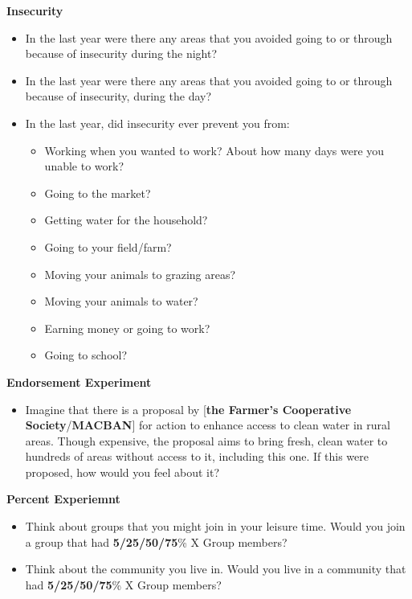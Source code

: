 \documentclass[11pt]{article}
\providecommand{\tightlist}{%
  \setlength{\itemsep}{0pt}\setlength{\parskip}{0pt}}
\begin{document}
\textbf{Insecurity}

\begin{itemize}
\tightlist
\item
  In the last year were there any areas that you avoided going to or
  through because of insecurity during the night?
\item
  In the last year were there any areas that you avoided going to or
  through because of insecurity, during the day?
\item
  In the last year, did insecurity ever prevent you from:

  \begin{itemize}
  \tightlist
  \item
    Working when you wanted to work? About how many days were you unable
    to work?
  \item
    Going to the market?
  \item
    Getting water for the household?
  \item
    Going to your field/farm?
  \item
    Moving your animals to grazing areas?
  \item
    Moving your animals to water?
  \item
    Earning money or going to work?
  \item
    Going to school?
  \end{itemize}
\end{itemize}

\textbf{Endorsement Experiment}

\begin{itemize}
\tightlist
\item
  Imagine that there is a proposal by {[}\textbf{the Farmer's
  Cooperative Society}/\textbf{MACBAN}{]} for action to enhance access
  to clean water in rural areas. Though expensive, the proposal aims to
  bring fresh, clean water to hundreds of areas without access to it,
  including this one. If this were proposed, how would you feel about
  it?
\end{itemize}

\textbf{Percent Experiemnt}

\begin{itemize}
\tightlist
\item
  Think about groups that you might join in your leisure time. Would you
  join a group that had \textbf{5/25/50/75}\% X Group members?
\item
  Think about the community you live in. Would you live in a community
  that had \textbf{5/25/50/75}\% X Group members?
\end{itemize}
\end{document}
